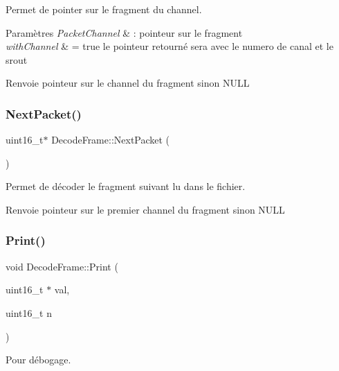 Permet de pointer sur le fragment du channel. 


\begin{DoxyParams}{Paramètres}
{\em Packet\+Channel} & \+: pointeur sur le fragment \\
\hline
{\em with\+Channel} & = true le pointeur retourné sera avec le numero de canal et le srout \\
\hline
\end{DoxyParams}
\begin{DoxyReturn}{Renvoie}
pointeur sur le channel du fragment sinon N\+U\+LL 
\end{DoxyReturn}
\mbox{\label{class_decode_frame_ad84d2562141edd3b4558cb2eb4e829c7}} 
\subsubsection{\texorpdfstring{Next\+Packet()}{NextPacket()}}
{\footnotesize\ttfamily uint16\+\_\+t$\ast$ Decode\+Frame\+::\+Next\+Packet (\begin{DoxyParamCaption}{ }\end{DoxyParamCaption})}



Permet de décoder le fragment suivant lu dans le fichier. 

\begin{DoxyReturn}{Renvoie}
pointeur sur le premier channel du fragment sinon N\+U\+LL 
\end{DoxyReturn}
\mbox{\label{class_decode_frame_a83d99fa14a97a0a0d7649afe63a44696}} 
\subsubsection{\texorpdfstring{Print()}{Print()}}
{\footnotesize\ttfamily void Decode\+Frame\+::\+Print (\begin{DoxyParamCaption}\item[{uint16\+\_\+t $\ast$}]{val,  }\item[{uint16\+\_\+t}]{n }\end{DoxyParamCaption})}



Pour débogage. 

